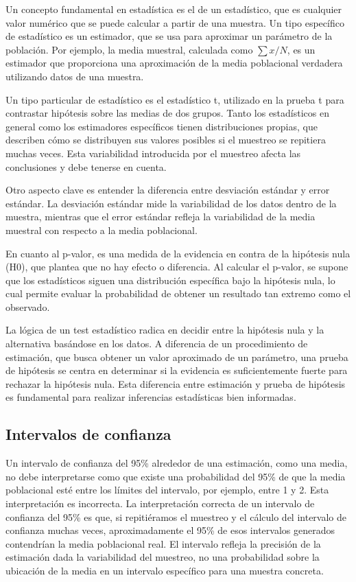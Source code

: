 \documentclass{config/apuntes}\usepackage[]{graphicx}\usepackage[]{xcolor}
\begin{document}
Un concepto fundamental en estadística es el de un estadístico, que es cualquier valor numérico que se puede calcular a partir de una muestra. Un tipo específico de estadístico es un estimador, que se usa para aproximar un parámetro de la población. Por ejemplo, la media muestral, calculada como $\sum x/N$, es un estimador que proporciona una aproximación de la media poblacional verdadera utilizando datos de una muestra.

Un tipo particular de estadístico es el estadístico t, utilizado en la prueba t para contrastar hipótesis sobre las medias de dos grupos. Tanto los estadísticos en general como los estimadores específicos tienen distribuciones propias, que describen cómo se distribuyen sus valores posibles si el muestreo se repitiera muchas veces. Esta variabilidad introducida por el muestreo afecta las conclusiones y debe tenerse en cuenta.

Otro aspecto clave es entender la diferencia entre desviación estándar y error estándar. La desviación estándar mide la variabilidad de los datos dentro de la muestra, mientras que el error estándar refleja la variabilidad de la media muestral con respecto a la media poblacional.

En cuanto al p-valor, es una medida de la evidencia en contra de la hipótesis nula (H0), que plantea que no hay efecto o diferencia. Al calcular el p-valor, se supone que los estadísticos siguen una distribución específica bajo la hipótesis nula, lo cual permite evaluar la probabilidad de obtener un resultado tan extremo como el observado.

La lógica de un test estadístico radica en decidir entre la hipótesis nula y la alternativa basándose en los datos. A diferencia de un procedimiento de estimación, que busca obtener un valor aproximado de un parámetro, una prueba de hipótesis se centra en determinar si la evidencia es suficientemente fuerte para rechazar la hipótesis nula. Esta diferencia entre estimación y prueba de hipótesis es fundamental para realizar inferencias estadísticas bien informadas.

\subsection{Intervalos de confianza}
Un intervalo de confianza del 95\% alrededor de una estimación, como una media, no debe interpretarse como que existe una probabilidad del 95\% de que la media poblacional esté entre los límites del intervalo, por ejemplo, entre 1 y 2. Esta interpretación es incorrecta. La interpretación correcta de un intervalo de confianza del 95\% es que, si repitiéramos el muestreo y el cálculo del intervalo de confianza muchas veces, aproximadamente el 95\% de esos intervalos generados contendrían la media poblacional real. El intervalo refleja la precisión de la estimación dada la variabilidad del muestreo, no una probabilidad sobre la ubicación de la media en un intervalo específico para una muestra concreta.
\end{document}
